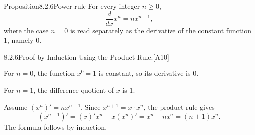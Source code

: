 \documentclass[main.tex]{subfiles}
\begin{document}
\begin{Obj}{Proposition}{8.2.6}{Power rule}
For every integer $n\ge0$,
\[
  \frac{d}{dx}x^n=nx^{n-1},
\]
where the case $n=0$ is read separately as the derivative of the constant function $1$,
namely $0$. 
\end{Obj}

\begin{Prf}{8.2.6}{Proof by Induction Using the Product Rule.}{[A10]}
\item For $n=0$, the function $x^0=1$ is constant, so its derivative is $0$.
\item For $n=1$, the difference quotient of $x$ is $1$.
\item Assume $(x^n)'=nx^{n-1}$. Since $x^{n+1}=x\cdot x^n$, the product rule gives
  \[
    (x^{n+1})'
    =
    (x)'x^n+x(x^n)'
    =
    x^n+nx^n
    =
    (n+1)x^n .
  \]
  The formula follows by induction.
\end{Prf}

\end{document}
